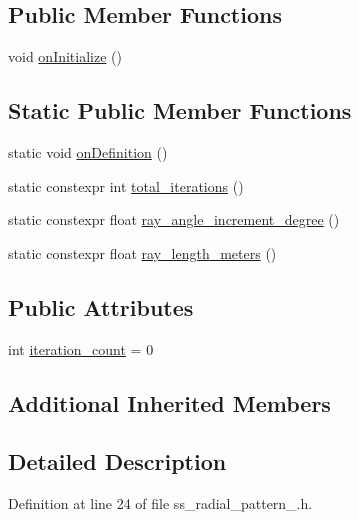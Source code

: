 \subsection*{Public Member Functions}
\begin{DoxyCompactItemize}
\item 
void \hyperlink{structsm__dance__bot_1_1SS2_1_1SsRadialPattern2_a2d11a340f0d3dd87f4b023d89f97843d}{on\+Initialize} ()
\end{DoxyCompactItemize}
\subsection*{Static Public Member Functions}
\begin{DoxyCompactItemize}
\item 
static void \hyperlink{structsm__dance__bot_1_1SS2_1_1SsRadialPattern2_ab85b08ae0877ad97807c2f7347814dcf}{on\+Definition} ()
\item 
static constexpr int \hyperlink{structsm__dance__bot_1_1SS2_1_1SsRadialPattern2_ad0857d841dbc555f236b625d1f6b1ba8}{total\+\_\+iterations} ()
\item 
static constexpr float \hyperlink{structsm__dance__bot_1_1SS2_1_1SsRadialPattern2_ae8c3743cac9f0b7680a169b8f73a7674}{ray\+\_\+angle\+\_\+increment\+\_\+degree} ()
\item 
static constexpr float \hyperlink{structsm__dance__bot_1_1SS2_1_1SsRadialPattern2_a4b9c96b0491d19e76f5b7811c6ed22a7}{ray\+\_\+length\+\_\+meters} ()
\end{DoxyCompactItemize}
\subsection*{Public Attributes}
\begin{DoxyCompactItemize}
\item 
int \hyperlink{structsm__dance__bot_1_1SS2_1_1SsRadialPattern2_afae1dd33bea98f712ba2938a35c0ddc1}{iteration\+\_\+count} = 0
\end{DoxyCompactItemize}
\subsection*{Additional Inherited Members}


\subsection{Detailed Description}


Definition at line 24 of file ss\+\_\+radial\+\_\+pattern\+\_.\+h.



